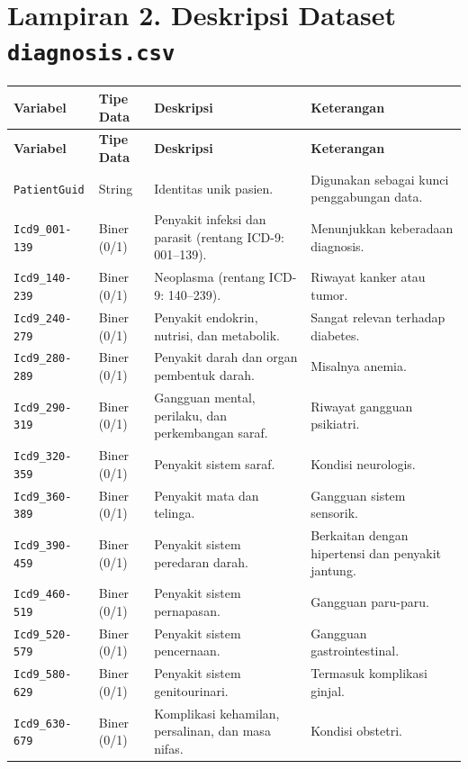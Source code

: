 \section*{Lampiran 2. Deskripsi Dataset \texttt{diagnosis.csv}}
\label{app:diagnosis}
\small
\begin{longtable}{|L{2.7cm}|C{1.8cm}|L{5.1cm}|L{3.5cm}|}
\hline
\textbf{Variabel} & \textbf{Tipe Data} & \textbf{Deskripsi} & \textbf{Keterangan}\\ \hline
\endfirsthead
\hline
\textbf{Variabel} & \textbf{Tipe Data} & \textbf{Deskripsi} & \textbf{Keterangan}\\ \hline
\endhead
\texttt{PatientGuid} & String & Identitas unik pasien. & Digunakan sebagai kunci penggabungan data.\\ \hline
\texttt{Icd9\_001-139} & Biner (0/1) & Penyakit infeksi dan parasit (rentang ICD-9: 001--139). & Menunjukkan keberadaan diagnosis.\\ \hline
\texttt{Icd9\_140-239} & Biner (0/1) & Neoplasma (rentang ICD-9: 140--239). & Riwayat kanker atau tumor.\\ \hline
\texttt{Icd9\_240-279} & Biner (0/1) & Penyakit endokrin, nutrisi, dan metabolik. & Sangat relevan terhadap diabetes.\\ \hline
\texttt{Icd9\_280-289} & Biner (0/1) & Penyakit darah dan organ pembentuk darah. & Misalnya anemia.\\ \hline
\texttt{Icd9\_290-319} & Biner (0/1) & Gangguan mental, perilaku, dan perkembangan saraf. & Riwayat gangguan psikiatri.\\ \hline
\texttt{Icd9\_320-359} & Biner (0/1) & Penyakit sistem saraf. & Kondisi neurologis.\\ \hline
\texttt{Icd9\_360-389} & Biner (0/1) & Penyakit mata dan telinga. & Gangguan sistem sensorik.\\ \hline
\texttt{Icd9\_390-459} & Biner (0/1) & Penyakit sistem peredaran darah. & Berkaitan dengan hipertensi dan penyakit jantung.\\ \hline
\texttt{Icd9\_460-519} & Biner (0/1) & Penyakit sistem pernapasan. & Gangguan paru-paru.\\ \hline
\texttt{Icd9\_520-579} & Biner (0/1) & Penyakit sistem pencernaan. & Gangguan gastrointestinal.\\ \hline
\texttt{Icd9\_580-629} & Biner (0/1) & Penyakit sistem genitourinari. & Termasuk komplikasi ginjal.\\ \hline
\texttt{Icd9\_630-679} & Biner (0/1) & Komplikasi kehamilan, persalinan, dan masa nifas. & Kondisi obstetri.\\ \hline

\end{longtable}
